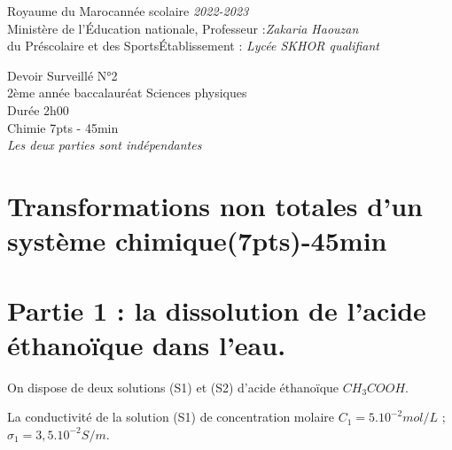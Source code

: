 \documentclass[12pt]{article}
\newcommand\headerMe[2]{\noindent{}#1\hfill#2}
\begin{document}
\headerMe{Royaume du Maroc}{année scolaire \emph{2022-2023}}\\
\headerMe{Ministère de l'Éducation nationale, }{  Professeur :\emph{Zakaria Haouzan}}\\
\headerMe{du Préscolaire et des Sports}{Établissement : \emph{Lycée SKHOR qualifiant}}\\
\begin{center}
Devoir Surveillé  N°2 \\
    2ème année baccalauréat Sciences physiques\\
Durée 2h00
\\
    \vspace{.2cm}
\hrulefill
\Large{Chimie 7pts - 45min}
\hrulefill\\

    \emph{Les deux parties sont indépendantes}
\end{center}

 \section*{Transformations non totales d'un système chimique\dotfill(7pts)-45min }



 \section*{Partie 1 : la dissolution de l’acide éthanoïque dans l’eau.
}

	On dispose de deux solutions (S1) et (S2) d’acide éthanoïque $CH_3COOH$.

	La conductivité de la solution (S1) de concentration molaire $C_1=5.10^{-2}mol/L$ ; $\sigma_1= 3,5.10^{-2}S/m$.
\end{document}
